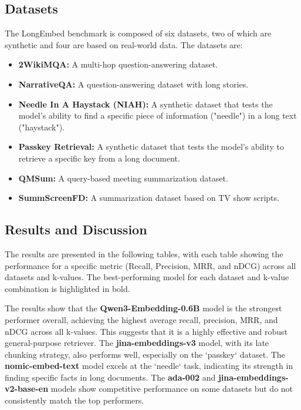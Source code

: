 \subsection{Datasets}
The LongEmbed benchmark is composed of six datasets, two of which are synthetic and four are based on real-world data. The datasets are:
\begin{itemize}
    \item \textbf{2WikiMQA:} A multi-hop question-answering dataset.
    \item \textbf{NarrativeQA:} A question-answering dataset with long stories.
    \item \textbf{Needle In A Haystack (NIAH):} A synthetic dataset that tests the model's ability to find a specific piece of information ("needle") in a long text ("haystack").
    \item \textbf{Passkey Retrieval:} A synthetic dataset that tests the model's ability to retrieve a specific key from a long document.
    \item \textbf{QMSum:} A query-based meeting summarization dataset.
    \item \textbf{SummScreenFD:} A summarization dataset based on TV show scripts.
\end{itemize}

\subsection{Results and Discussion}
The results are presented in the following tables, with each table showing the performance for a specific metric (Recall, Precision, MRR, and nDCG) across all datasets and k-values. The best-performing model for each dataset and k-value combination is highlighted in bold.



The results show that the \textbf{Qwen3-Embedding-0.6B} model is the strongest performer overall, achieving the highest average recall, precision, MRR, and nDCG across all k-values. This suggests that it is a highly effective and robust general-purpose retriever. The \textbf{jina-embeddings-v3} model, with its late chunking strategy, also performs well, especially on the `passkey` dataset. The \textbf{nomic-embed-text} model excels at the `needle` task, indicating its strength in finding specific facts in long documents. The \textbf{ada-002} and \textbf{jina-embeddings-v2-base-en} models show competitive performance on some datasets but do not consistently match the top performers.


